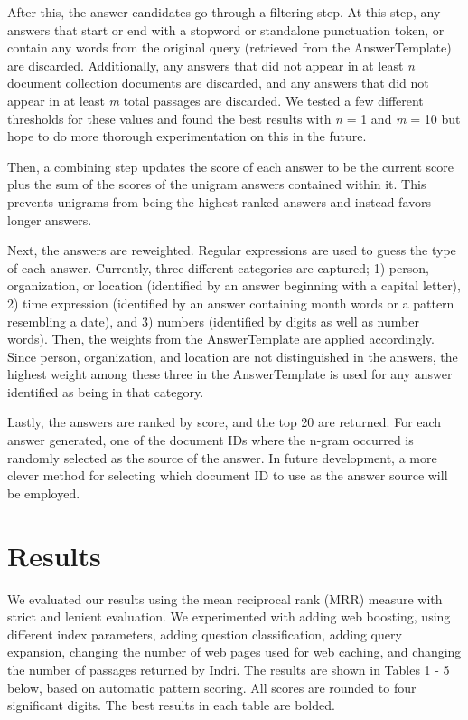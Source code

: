 \documentclass[11pt]{article}
\begin{document}
After this, the answer candidates go through a filtering step.  At this step, any answers that start or end with a stopword or standalone punctuation token, or contain any words from the original query (retrieved from the AnswerTemplate) are discarded.  Additionally, any answers that did not appear in at least \emph{n} document collection documents are discarded, and any answers that did not appear in at least \emph{m} total passages are discarded.  We tested a few different thresholds for these values and found the best results with \emph{n} = 1 and \emph{m} = 10 but hope to do more thorough experimentation on this in the future.

Then, a combining step updates the score of each answer to be the current score plus the sum of the scores of the unigram answers contained within it. This prevents unigrams from being the highest ranked answers and instead favors longer answers.

Next, the answers are reweighted.  Regular expressions are used to guess the type of each answer.  Currently, three different categories are captured; 1) person, organization, or location (identified by an answer beginning with a capital letter), 2) time expression (identified by an answer containing month words or a pattern resembling a date), and 3) numbers (identified by digits as well as number words).  Then, the weights from the AnswerTemplate are applied accordingly.  Since person, organization, and location are not distinguished in the answers, the highest weight among these three in the AnswerTemplate is used for any answer identified as being in that category.

Lastly, the answers are ranked by score, and the top 20 are returned.  For each answer generated, one of the document IDs where the n-gram occurred is randomly selected as the source of the answer.  In future development, a more clever method for selecting which document ID to use as the answer source will be employed.

\section{Results}

We evaluated our results using the mean reciprocal rank (MRR) measure with strict and lenient evaluation. We experimented with adding web boosting, using different index parameters, adding question classification, adding query expansion, changing the number of web pages used for web caching, and changing the number of passages returned by Indri.  The results are shown in Tables 1 - 5 below, based on automatic pattern scoring.  All scores are rounded to four significant digits.  The best results in each table are bolded.
\end{document}
